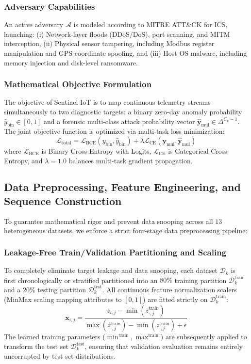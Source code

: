 \documentclass[11pt,a4paper]{article}
\begin{document}
\subsubsection{Adversary Capabilities}
An active adversary $\mathcal{A}$ is modeled according to MITRE ATT\&CK for ICS, launching: (i) Network-layer floods ($\text{DDoS}/\text{DoS}$), port scanning, and $\text{MITM}$ interception, (ii) Physical sensor tampering, including Modbus register manipulation and GPS coordinate spoofing, and (iii) Host OS malware, including memory injection and disk-level ransomware.

\subsubsection{Mathematical Objective Formulation}
The objective of Sentinel-IoT is to map continuous telemetry streams simultaneously to two diagnostic targets: a binary zero-day anomaly probability $\hat{y}_{\text{bin}} \in [0, 1]$ and a forensic multi-class attack probability vector $\hat{\mathbf{y}}_{\text{mul}} \in \Delta^{C_k-1}$. The joint objective function is optimized via multi-task loss minimization:
\begin{equation}
    \mathcal{L}_{\text{total}} = \mathcal{L}_{\text{BCE}}(y_{\text{bin}}, \hat{y}_{\text{bin}}) + \lambda \mathcal{L}_{\text{CE}}(\mathbf{y}_{\text{mul}}, \hat{\mathbf{y}}_{\text{mul}})
    \label{eq:total_loss}
\end{equation}
where $\mathcal{L}_{\text{BCE}}$ is Binary Cross-Entropy with Logits, $\mathcal{L}_{\text{CE}}$ is Categorical Cross-Entropy, and $\lambda = 1.0$ balances multi-task gradient propagation.

\subsection{Data Preprocessing, Feature Engineering, and Sequence Construction}
To guarantee mathematical rigor and prevent data snooping across all $13$ heterogeneous datasets, we enforce a strict four-stage data preprocessing pipeline:

\subsubsection{Leakage-Free Train/Validation Partitioning and Scaling}
To completely eliminate target leakage and data snooping, each dataset $\mathcal{D}_k$ is first chronologically or stratified partitioned into an $80\%$ training partition $\mathcal{D}_k^{\text{train}}$ and a $20\%$ testing partition $\mathcal{D}_k^{\text{test}}$. All continuous feature normalization scalers (MinMax scaling mapping attributes to $[0, 1]$) are fitted strictly on $\mathcal{D}_k^{\text{train}}$:
\begin{equation}
    \mathbf{x}_{i, j} = \frac{z_{i, j} - \min(z_{\cdot, j}^{\text{train}})}{\max(z_{\cdot, j}^{\text{train}}) - \min(z_{\cdot, j}^{\text{train}}) + \epsilon}
\end{equation}
The learned training parameters ($\min^{\text{train}}, \max^{\text{train}}$) are subsequently applied to transform the test set $\mathcal{D}_k^{\text{test}}$, ensuring that validation evaluation remains entirely uncorrupted by test set distributions.
\end{document}
